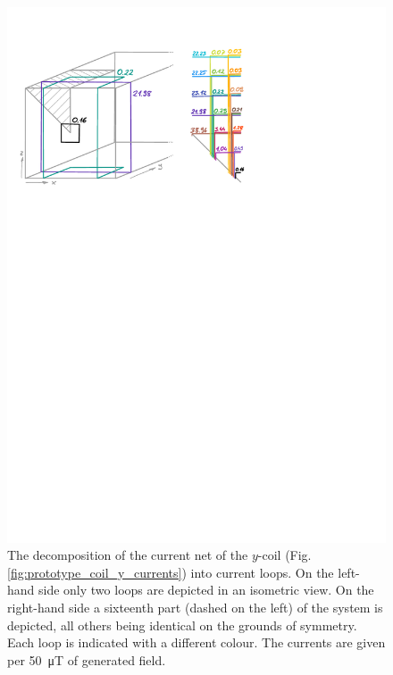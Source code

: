 \begin{figure}
  \centering
  \includegraphics[width=0.9\linewidth]{gfx/prototype/coil_y_decomposition.pdf}
  \caption{The decomposition of the current net of the $y$-coil (Fig.\,\ref{fig:prototype_coil_y_currents}) into current loops. On the left-hand side only two loops are depicted in an isometric view. On the right-hand side a sixteenth part (dashed on the left) of the system is depicted, all others being identical on the grounds of symmetry. Each loop is indicated with a different colour. The currents are given per \SI{50}{\micro\tesla} of generated field.}\label{fig:prototype_coil_y_decomposition}
\end{figure}

